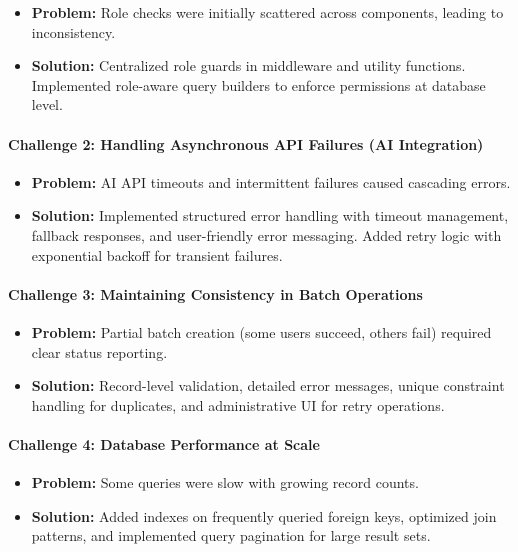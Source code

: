 \documentclass[11pt,a4paper]{article}
\begin{document}
\begin{itemize}
    \item \textbf{Problem:} Role checks were initially scattered across components, leading to inconsistency.
    \item \textbf{Solution:} Centralized role guards in middleware and utility functions. Implemented role-aware query builders to enforce permissions at database level.
\end{itemize}

\paragraph{Challenge 2: Handling Asynchronous API Failures (AI Integration)}

\begin{itemize}
    \item \textbf{Problem:} AI API timeouts and intermittent failures caused cascading errors.
    \item \textbf{Solution:} Implemented structured error handling with timeout management, fallback responses, and user-friendly error messaging. Added retry logic with exponential backoff for transient failures.
\end{itemize}

\paragraph{Challenge 3: Maintaining Consistency in Batch Operations}

\begin{itemize}
    \item \textbf{Problem:} Partial batch creation (some users succeed, others fail) required clear status reporting.
    \item \textbf{Solution:} Record-level validation, detailed error messages, unique constraint handling for duplicates, and administrative UI for retry operations.
\end{itemize}

\paragraph{Challenge 4: Database Performance at Scale}

\begin{itemize}
    \item \textbf{Problem:} Some queries were slow with growing record counts.
    \item \textbf{Solution:} Added indexes on frequently queried foreign keys, optimized join patterns, and implemented query pagination for large result sets.
\end{itemize}
\end{document}
